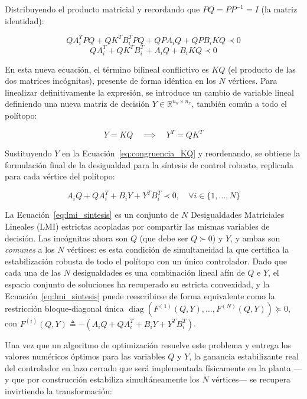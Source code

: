 Distribuyendo el producto matricial y recordando que $P Q = P P^{-1} = I$ (la matriz identidad):

\begin{equation}
    Q A_i^T P Q + Q K^T B_i^T P Q + Q P A_i Q + Q P B_iK Q \prec 0
    \label{eq:congruencia_paso2}
\end{equation}
\begin{equation}
    Q A_i^T + Q K^T B_i^T + A_i Q + B_iK Q \prec 0
    \label{eq:congruencia_KQ}
\end{equation}

En esta nueva ecuación, el término bilineal conflictivo es $K Q$ (el producto de las dos matrices incógnitas), presente de forma idéntica en los $N$ vértices. Para linealizar definitivamente la expresión, se introduce un cambio de variable lineal definiendo una nueva matriz de decisión $Y \in \mathbb{R}^{n_u \times n_x}$, también común a todo el polítopo:

\begin{equation}
    Y = K Q \quad \implies \quad Y^T = Q K^T
    \label{eq:cambio_variable_Y}
\end{equation}

Sustituyendo $Y$ en la Ecuación~\eqref{eq:congruencia_KQ} y reordenando, se obtiene la formulación final de la desigualdad para la síntesis de control robusto, replicada para cada vértice del polítopo:

\begin{equation}
    A_iQ + Q A_i^T + B_iY + Y^T B_i^T \prec 0, \quad \forall i \in \{1, \dots, N\}
    \label{eq:lmi_sintesis}
\end{equation}

La Ecuación~\eqref{eq:lmi_sintesis} es un conjunto de $N$ Desigualdades Matriciales Lineales (LMI) estrictas acopladas por compartir las mismas variables de decisión. Las incógnitas ahora son $Q$ (que debe ser $Q \succ 0$) y $Y$, y ambas son \emph{comunes} a los $N$ vértices: es esta condición de simultaneidad la que certifica la estabilización robusta de todo el polítopo con un único controlador. Dado que cada una de las $N$ desigualdades es una combinación lineal afín de $Q$ e $Y$, el espacio conjunto de soluciones ha recuperado su estricta convexidad, y la Ecuación~\eqref{eq:lmi_sintesis} puede reescribirse de forma equivalente como la restricción bloque-diagonal única $\operatorname{diag}(F^{(1)}(Q,Y), \dots, F^{(N)}(Q,Y)) \succeq 0$, con $F^{(i)}(Q,Y) \triangleq -\left(A_iQ + Q A_i^T + B_iY + Y^T B_i^T\right)$.

Una vez que un algoritmo de optimización resuelve este problema y entrega los valores numéricos óptimos para las variables $Q$ y $Y$, la ganancia estabilizante real del controlador en lazo cerrado que será implementada físicamente en la planta —y que por construcción estabiliza simultáneamente los $N$ vértices— se recupera invirtiendo la transformación:

